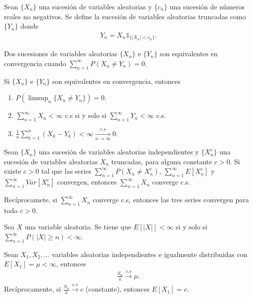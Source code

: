 \begin{defi}
    Sean $\{X_n\}$ una sucesión de variables aleatorias y $\{c_n\}$ una sucesión de números reales no negativos. Se define la sucesión de variables aleatorias truncadas como $\{Y_n\}$  donde
    \begin{align*}
        Y_n = X_n \mathbb{1}_{\{|X_n| < c_n\}}.
    \end{align*}
\end{defi}

\begin{defi}
    Dos sucesiones de variables aleatorias $\{X_n\}$ e $\{Y_n\}$ son equivalentes en convergencia cuando $\sum_{n=1}^{\infty} P(X_n \not = Y_n) = 0$.
\end{defi}

\begin{teo}
    Si $\{X_n\}$ e $\{Y_n\}$ son equivalentes en convergencia, entonces
    \begin{enumerate}
        \item $P\left( \limsup_n \{X_n \not = Y_n \}\right) = 0$.
        \item $\sum_{n=1}^{\infty} X_n < \infty$ c.s si y solo si $\sum_{n=1}^{\infty} Y_n < \infty$ c.s.
        \item $\frac{1}{n} \sum_{k=1}^{n} (X_k -Y_k) < \infty \xrightarrow[n \to \infty]{c.s} 0$.
    \end{enumerate}
\end{teo}
\begin{teo}
    Sean $\{X_n\}$ una sucesión de variables aleatorias independientes y $\{X_n^c\}$ una sucesión de variables aleatorias $X_n$ truncadas, para alguna constante $c>0$. Si existe $c>0$ tal que las series $\sum_{n=1}^{\infty} P(X_n \not = X_n^c)$, $\sum_{n=1}^{\infty} E[X_n^c]$ y $\sum_{n=1}^{\infty} Var[X_n^c]$ convergen, entonces $\sum_{n=1}^{\infty} X_n$ converge c.s.

    Recíprocamete, si $\sum_{n=1}^{\infty} X_n$ converge c.s, entonces las tres series convergen para todo $c>0$.
\end{teo}

\begin{lema}
    Sea $X$ una variable aleatoria. Se tiene que $E[|X|] < \infty$ si y solo si \newline $\sum_{n=1}^{\infty} P(|X| \ge n) < \infty$.
\end{lema}

\begin{teo}
    Sean $X_1,X_2,\ldots$ variables aleatorias independientes e igualmente distribuidas con $E[X_1] = \mu< \infty$, entonces
    \begin{align*}
        \frac{S_n}{n} \xrightarrow[]{c.s} \mu.
    \end{align*}
    Recíprocamente, si $\frac{S_n}{n} \xrightarrow[]{c.s} c$ (constante), entonces $E[X_1] = c$.
\end{teo}

